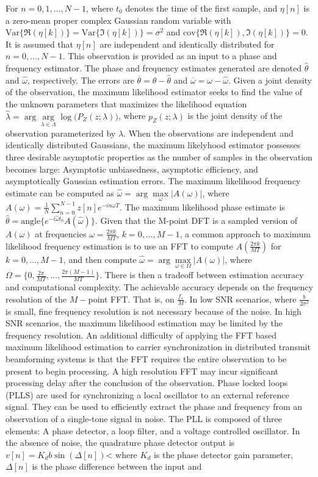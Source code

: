 \documentclass[oneside]{book}
\theoremstyle{mystyle}
\begin{document}
For $n=0,1,\hdots, N-1$, where $t_0$ denotes the time of the first sample, and $\eta[n]$ is a zero-mean proper complex Gaussian random variable with $\textrm{Var}\{\Re(\eta[k])\} = \textrm{Var}\{\Im(\eta[k])\} =\sigma^2$ and $\textrm{cov}\{\Re(\eta[k]),\Im(\eta[k])\} = 0$. It is assumed that $\eta[n]$ are independent and identically distributed for $n=0,\hdots, N-1$. This observation is provided as an input to a phase and frequency estimator. The phase and frequency estimates generated are denoted $\hat{\theta}$ and $\hat{\omega}$, respectively. The errors are $\overline{\theta} = \theta - \hat{\theta}$ and $\overline{\omega} = \omega - \hat{\omega}$. Given a joint density of the observation, the maximum likelihood estimator seeks to find the value of the unknown parameters that maximizes the likelihood equation $\hat{\lambda} = \arg \underset{\lambda \in \Lambda}\arg \log\big(P_{Z}(z;\lambda)\big)$, where $p_{Z}(z;\lambda)$ is the joint density of the observation parameterized by $\lambda$. When the observations are independent and identically distributed Gaussians, the maximum likelyhood estimator possesses three desirable asymptotic properties as the number of samples in the observation becomes large: Asymptotic unbiasedness, asymptotic efficiency, and asymptotically Gaussian estimation errors. The maximum likelihood frequency estimate can be computed as $\hat{\omega} = \arg\underset{\omega}\max|A(\omega)|$, where $A(\omega) = \frac{1}{N}\sum_{n=0}^{N-1}z[n]e^{-in\omega T}$. The maximum likelihood phase estimate is $\hat{\theta} = \textrm{angle}\{e^{-i\hat{\omega}t_{0}}A(\hat{\omega})\}$. Given that the M-point DFT is a sampled version of $A(\omega)$ at frequencies $\omega = \frac{2\pi k}{MT}$, $k=0,\hdots, M-1$, a common approach to maximum likelihood frequency estimation is to use an FFT to compute $A(\frac{2\pi k}{MT})$ for $k=0,\hdots, M-1$, and then compute $\hat{\omega} = \arg\underset{\omega \in \Omega}\max |A(\omega)|$, where $\Omega = \{0,\frac{2\pi}{MT},\hdots, \frac{2\pi(M-1)}{MT}\}$. There is then a tradeoff between estimation accuracy and computational complexity. The achievable accuracy depends on the frequency resolution of the $M-$point FFT. That is, on $\frac{f_{s}}{M}$. In low SNR scenarios, where $\frac{b}{2\sigma^2}$ is small, fine frequency resolution is not necessary because of the noise. In high SNR scenarios, the maximum likelihood estimation may be limited by the frequency resolution. An additional difficulty of applying the FFT based maximum likelihood estimation to carrier synchronization in distributed transmit beamforming systems is that the FFT requires the entire observation to be present to begin processing. A high resolution FFT may incur significant processing delay after the conclusion of the observation. Phase locked loops (PLLS) are used for synchronizing a local oscillator to an external reference signal. They can be used to efficiently extract the phase and frequency from an observation of a single-tone signal in noise. The PLL is composed of three elements: A phase detector, a loop filter, and a voltage controlled oscillator. In the absence of noise, the quadrature phase detector output is $v[n] = K_{d}b\sin(\Delta[n])$< where $K_{d}$ is the phase detector gain parameter, $\Delta[n]$ is the phase difference between the input and 
\end{document}
